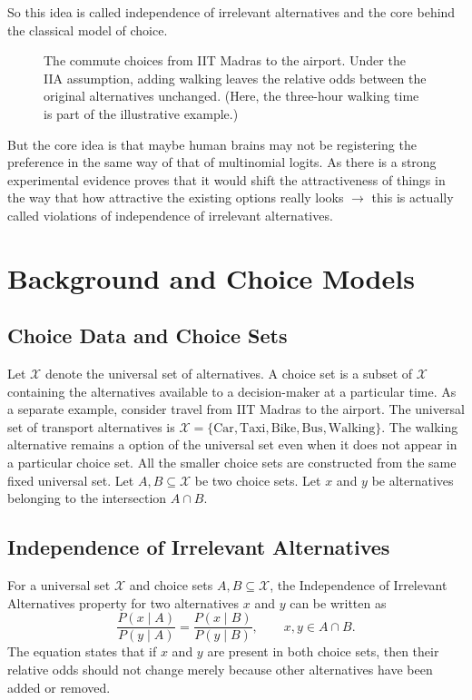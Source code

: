 \documentclass[11pt,a4paper]{article}
\newcommand{\X}{\mathcal{X}}
\begin{document}
So this idea is called independence of irrelevant alternatives and the
core behind the classical model of choice.

\begin{figure}[H]
    \centering
    
    \caption[IIT Madras--airport choices]{The commute choices from IIT Madras to the airport. Under the IIA assumption, adding walking leaves the relative odds between the original alternatives unchanged. (Here, the three-hour walking time is part of the illustrative example.)}
    \label{fig:phase1-airport-choices}
\end{figure}

But the core idea is that maybe human brains may not be registering
the preference in the same way of that of multinomial logits. As
there is a strong experimental evidence proves that it would shift the attractiveness of things in the way that how attractive the existing options really looks $\rightarrow$ this is actually called violations of independence of irrelevant alternatives.\cite{seshadri2019}
\clearpage


\section{Background and Choice Models}
\subsection{Choice Data and Choice Sets}
Let \(\X\) denote the universal set of alternatives. A choice set is a
subset of \(\X\) containing the alternatives available to a decision-maker
at a particular time.
As a separate example, consider travel from IIT Madras to the
airport. The universal set of transport alternatives is
\(\X= \{ \text{Car}, \text{Taxi}, \text{Bike}, \text{Bus}, \text{Walking} \}.\)
The walking alternative remains a option of the universal set even when it
does not appear in a particular choice set. All the smaller choice sets are
constructed from the same fixed universal set.
Let \(A,B\subseteq\X\) be two choice sets. Let \(x\) and \(y\) be
alternatives belonging to the intersection \(A\cap B\).
\subsection{Independence of Irrelevant Alternatives}
For a universal set \(\X\) and choice sets \(A,B\subseteq\X\), the
Independence of Irrelevant Alternatives property for two alternatives
\(x\) and \(y\) can be written as
\begin{equation}
    \frac{P(x\mid A)}{P(y\mid A)}
    =
    \frac{P(x\mid B)}{P(y\mid B)},
    \qquad
    x,y\in A\cap B.
    \label{eq:iia}
\end{equation}
The equation states that if \(x\) and \(y\) are present in both choice sets,
then their relative odds should not change merely because other alternatives
have been added or removed.
\end{document}

